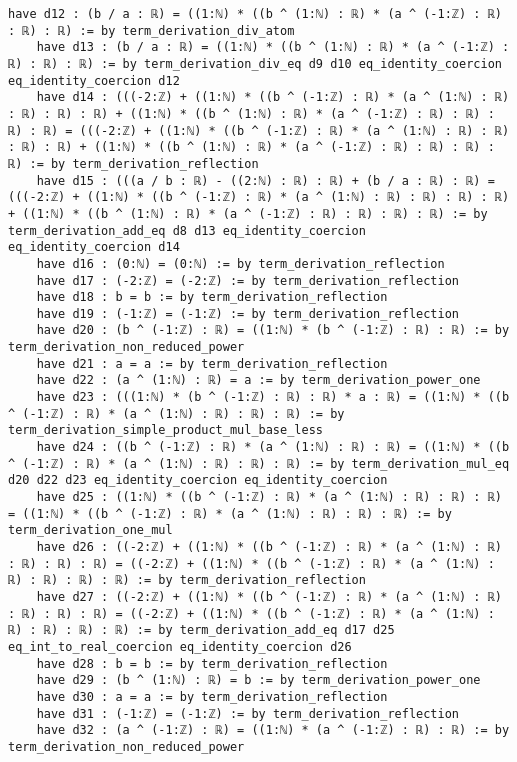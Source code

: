 \documentclass{article}
\begin{document}
\begin{tcolorbox}[colback=white!10, width=\linewidth]
\begin{lstlisting}[language=Lean4]
    have d12 : (b / a : ℝ) = ((1:ℕ) * ((b ^ (1:ℕ) : ℝ) * (a ^ (-1:ℤ) : ℝ) : ℝ) : ℝ) := by term_derivation_div_atom
    have d13 : (b / a : ℝ) = ((1:ℕ) * ((b ^ (1:ℕ) : ℝ) * (a ^ (-1:ℤ) : ℝ) : ℝ) : ℝ) := by term_derivation_div_eq d9 d10 eq_identity_coercion eq_identity_coercion d12
    have d14 : (((-2:ℤ) + ((1:ℕ) * ((b ^ (-1:ℤ) : ℝ) * (a ^ (1:ℕ) : ℝ) : ℝ) : ℝ) : ℝ) + ((1:ℕ) * ((b ^ (1:ℕ) : ℝ) * (a ^ (-1:ℤ) : ℝ) : ℝ) : ℝ) : ℝ) = (((-2:ℤ) + ((1:ℕ) * ((b ^ (-1:ℤ) : ℝ) * (a ^ (1:ℕ) : ℝ) : ℝ) : ℝ) : ℝ) + ((1:ℕ) * ((b ^ (1:ℕ) : ℝ) * (a ^ (-1:ℤ) : ℝ) : ℝ) : ℝ) : ℝ) := by term_derivation_reflection
    have d15 : (((a / b : ℝ) - ((2:ℕ) : ℝ) : ℝ) + (b / a : ℝ) : ℝ) = (((-2:ℤ) + ((1:ℕ) * ((b ^ (-1:ℤ) : ℝ) * (a ^ (1:ℕ) : ℝ) : ℝ) : ℝ) : ℝ) + ((1:ℕ) * ((b ^ (1:ℕ) : ℝ) * (a ^ (-1:ℤ) : ℝ) : ℝ) : ℝ) : ℝ) := by term_derivation_add_eq d8 d13 eq_identity_coercion eq_identity_coercion d14
    have d16 : (0:ℕ) = (0:ℕ) := by term_derivation_reflection
    have d17 : (-2:ℤ) = (-2:ℤ) := by term_derivation_reflection
    have d18 : b = b := by term_derivation_reflection
    have d19 : (-1:ℤ) = (-1:ℤ) := by term_derivation_reflection
    have d20 : (b ^ (-1:ℤ) : ℝ) = ((1:ℕ) * (b ^ (-1:ℤ) : ℝ) : ℝ) := by term_derivation_non_reduced_power
    have d21 : a = a := by term_derivation_reflection
    have d22 : (a ^ (1:ℕ) : ℝ) = a := by term_derivation_power_one
    have d23 : (((1:ℕ) * (b ^ (-1:ℤ) : ℝ) : ℝ) * a : ℝ) = ((1:ℕ) * ((b ^ (-1:ℤ) : ℝ) * (a ^ (1:ℕ) : ℝ) : ℝ) : ℝ) := by term_derivation_simple_product_mul_base_less
    have d24 : ((b ^ (-1:ℤ) : ℝ) * (a ^ (1:ℕ) : ℝ) : ℝ) = ((1:ℕ) * ((b ^ (-1:ℤ) : ℝ) * (a ^ (1:ℕ) : ℝ) : ℝ) : ℝ) := by term_derivation_mul_eq d20 d22 d23 eq_identity_coercion eq_identity_coercion
    have d25 : ((1:ℕ) * ((b ^ (-1:ℤ) : ℝ) * (a ^ (1:ℕ) : ℝ) : ℝ) : ℝ) = ((1:ℕ) * ((b ^ (-1:ℤ) : ℝ) * (a ^ (1:ℕ) : ℝ) : ℝ) : ℝ) := by term_derivation_one_mul
    have d26 : ((-2:ℤ) + ((1:ℕ) * ((b ^ (-1:ℤ) : ℝ) * (a ^ (1:ℕ) : ℝ) : ℝ) : ℝ) : ℝ) = ((-2:ℤ) + ((1:ℕ) * ((b ^ (-1:ℤ) : ℝ) * (a ^ (1:ℕ) : ℝ) : ℝ) : ℝ) : ℝ) := by term_derivation_reflection
    have d27 : ((-2:ℤ) + ((1:ℕ) * ((b ^ (-1:ℤ) : ℝ) * (a ^ (1:ℕ) : ℝ) : ℝ) : ℝ) : ℝ) = ((-2:ℤ) + ((1:ℕ) * ((b ^ (-1:ℤ) : ℝ) * (a ^ (1:ℕ) : ℝ) : ℝ) : ℝ) : ℝ) := by term_derivation_add_eq d17 d25 eq_int_to_real_coercion eq_identity_coercion d26
    have d28 : b = b := by term_derivation_reflection
    have d29 : (b ^ (1:ℕ) : ℝ) = b := by term_derivation_power_one
    have d30 : a = a := by term_derivation_reflection
    have d31 : (-1:ℤ) = (-1:ℤ) := by term_derivation_reflection
    have d32 : (a ^ (-1:ℤ) : ℝ) = ((1:ℕ) * (a ^ (-1:ℤ) : ℝ) : ℝ) := by term_derivation_non_reduced_power

\end{lstlisting}
\end{tcolorbox}
\end{document}

